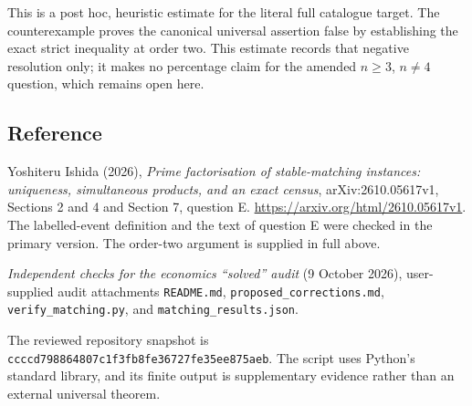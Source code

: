 \documentclass[11pt,a4paper]{article}
\begin{document}
This is a post hoc, heuristic estimate for the literal full catalogue target.
The counterexample proves the canonical universal assertion false by establishing the exact strict inequality at order two. This estimate records that negative resolution only; it makes no percentage claim for the amended $n\geq3$, $n\ne4$ question, which remains open here.

\subsection*{Reference}
Yoshiteru Ishida (2026), \emph{Prime factorisation of stable-matching instances: uniqueness, simultaneous products, and an exact census}, arXiv:2610.05617v1, Sections 2 and 4 and Section 7, question E. \url{https://arxiv.org/html/2610.05617v1}. The labelled-event definition and the text of question E were checked in the primary version. The order-two argument is supplied in full above.

\emph{Independent checks for the economics ``solved'' audit} (9 October 2026), user-supplied audit attachments \texttt{README.md}, \texttt{proposed\_corrections.md}, \texttt{verify\_matching.py}, and \texttt{matching\_results.json}.

The reviewed repository snapshot is \texttt{ccccd798864807c1f3fb8fe36727fe35ee875aeb}. The script uses Python's standard library, and its finite output is supplementary evidence rather than an external universal theorem.
\end{document}
